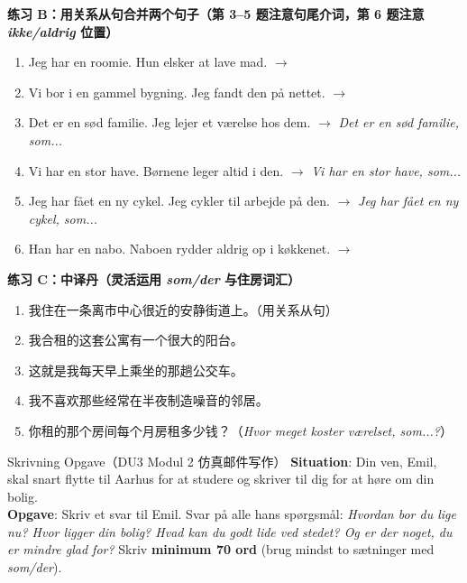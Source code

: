 \textbf{练习 B：用关系从句合并两个句子（第 3--5 题注意句尾介词，第 6 题注意 \textit{ikke/aldrig} 位置）}
\begin{enumerate}
  \item Jeg har en roomie. Hun elsker at lave mad. $\rightarrow$
  \item Vi bor i en gammel bygning. Jeg fandt den på nettet. $\rightarrow$
  \item Det er en sød familie. Jeg lejer et værelse hos dem. $\rightarrow$ \textit{Det er en sød familie, som...}
  \item Vi har en stor have. Børnene leger altid i den. $\rightarrow$ \textit{Vi har en stor have, som...}
  \item Jeg har fået en ny cykel. Jeg cykler til arbejde på den. $\rightarrow$ \textit{Jeg har fået en ny cykel, som...}
  \item Han har en nabo. Naboen rydder aldrig op i køkkenet. $\rightarrow$
\end{enumerate}

\textbf{练习 C：中译丹（灵活运用 \textit{som/der} 与住房词汇）}
\begin{enumerate}
  \item 我住在一条离市中心很近的安静街道上。（用关系从句）
  \item 我合租的这套公寓有一个很大的阳台。
  \item 这就是我每天早上乘坐的那趟公交车。
  \item 我不喜欢那些经常在半夜制造噪音的邻居。
  \item 你租的那个房间每个月房租多少钱？（\textit{Hvor meget koster værelset, som...?}）
\end{enumerate}


\begin{emailbox}{Skrivning Opgave（DU3 Modul 2 仿真邮件写作）}
\textbf{Situation}: Din ven, Emil, skal snart flytte til Aarhus for at studere og skriver til dig for at høre om din bolig.\\
\textbf{Opgave}: Skriv et svar til Emil. Svar på alle hans spørgsmål: \textit{Hvordan bor du lige nu? Hvor ligger din bolig? Hvad kan du godt lide ved stedet? Og er der noget, du er mindre glad for?} Skriv \textbf{minimum 70 ord} (brug mindst to sætninger med \textit{som/der}).
\end{emailbox}

